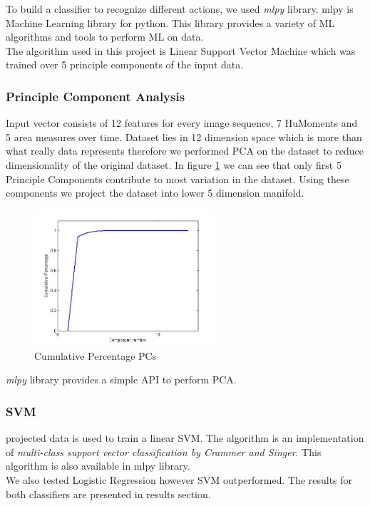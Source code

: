 To build a classifier to recognize different actions, we used \textit{mlpy} library. mlpy is Machine Learning library for python. This library provides a variety of ML algorithms and tools to perform ML on data.\\
The algorithm used in this project is Linear Support Vector Machine which was trained over 5 principle components of the input data.
\subsubsection*{Principle Component Analysis}
Input vector consists of 12 features for every image sequence, 7 HuMoments and 5 area measures over time. Dataset lies in 12 dimension space which is more than what really data represents therefore we performed PCA on the dataset to reduce dimensionality of the original dataset. In figure \ref{fig:pca} we can see that only first 5 Principle Components contribute to most variation in the dataset. Using these components we project the dataset into lower 5 dimension manifold.\\

\begin{figure}[htp]
\begin{center}
\leavevmode
\includegraphics[width=0.6\textwidth] {pca.jpg}
\end{center}
\caption{Cumulative Percentage PCs}
\label{fig:pca}
\end{figure}

\textit{mlpy} library provides a simple API to perform PCA.
\subsubsection*{SVM}
projected data is used to train a linear SVM. The algorithm is an implementation of \textit{multi-class support vector classification by Crammer and Singer}. This algorithm is also available in mlpy library.\\
We also tested Logistic Regression however SVM outperformed. The results for both classifiers are presented in results section.

